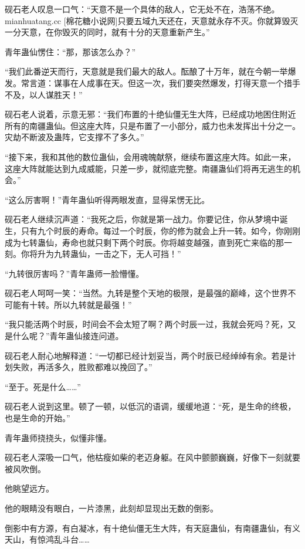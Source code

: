 
\begin{this_body}

砚石老人叹息一口气：“天意不是一个具体的敌人，它无处不在，浩荡不绝。mianhuatang.cc [棉花糖小说网]只要五域九天还在，天意就永存不灭。你就算毁灭一分天意，在你毁灭的同时，就有十分的天意重新产生。”

青年蛊仙愣住：“那，那该怎么办？”

“我们此番逆天而行，天意就是我们最大的敌人。酝酿了十万年，就在今朝一举爆发。常言道：谋事在人成事在天。但这一次，我们要突然爆发，打得天意一个措手不及，以人谋胜天！”

砚石老人说着，示意无邪：“我们布置的十绝仙僵无生大阵，已经成功地困住附近所有的南疆蛊仙。但这座大阵，只是布置了一小部分，威力也未发挥出十分之一。灾劫不断波及蛊阵，它支撑不了多久。”

“接下来，我和其他的数位蛊仙，会用魂魄献祭，继续布置这座大阵。如此一来，这座大阵就能达到九成威能，只差一步，就彻底完整。南疆蛊仙们将再无逃生的机会。”

“这么厉害啊！”青年蛊仙听得两眼发直，显得呆愣无比。

砚石老人继续沉声道：“我死之后，你就是第一战力。你要记住，你从梦境中诞生，只有九个时辰的寿命。每过一个时辰，你的修为就会上升一转。如今，你刚刚成为七转蛊仙，寿命也就只剩下两个时辰。你将越变越强，直到死亡来临的那一刻。你将升为九转蛊仙，一击之下，无人可挡！”

“九转很厉害吗？”青年蛊师一脸懵懂。

砚石老人呵呵一笑：“当然。九转是整个天地的极限，是最强的巅峰，这个世界不可能有十转。所以九转就是最强！”

“我只能活两个时辰，时间会不会太短了啊？两个时辰一过，我就会死吗？死，又是什么呢？”青年蛊仙接连问道。

砚石老人耐心地解释道：“一切都已经计划妥当，两个时辰已经绰绰有余。若是计划失败，再活多久，胜败都难以挽回了。”

“至于。死是什么……”

砚石老人说到这里。顿了一顿，以低沉的语调，缓缓地道：“死，是生命的终极，也是生命的开始。”

青年蛊师挠挠头，似懂非懂。

砚石老人深吸一口气，他枯瘦如柴的老迈身躯。在风中颤颤巍巍，好像下一刻就要被风吹倒。

他眺望远方。

他的眼睛没有眼白，一片漆黑，此刻却显现出无数的倒影。

倒影中有方源，有白凝冰，有十绝仙僵无生大阵，有天庭蛊仙，有南疆蛊仙，有义天山，有惊鸿乱斗台……


\end{this_body}
